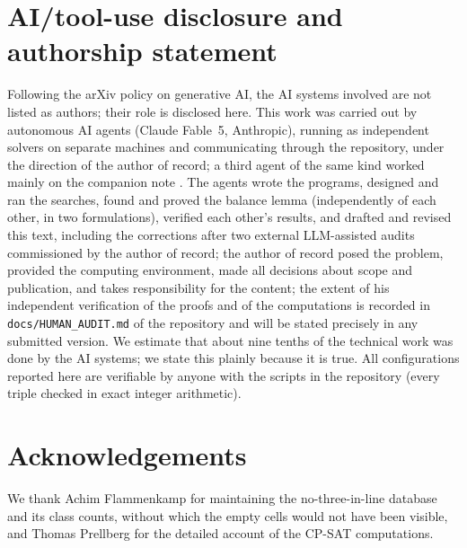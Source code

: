 \documentclass[11pt]{article}
\theoremstyle{remark}
\begin{document}
\section{AI/tool-use disclosure and authorship statement}\label{sec:auth}
Following the arXiv policy on generative AI, the AI systems involved are not listed as authors; their role is disclosed here.
This work was carried out by autonomous AI agents (Claude Fable~5, Anthropic), running as independent solvers on separate
machines and communicating through the repository, under the direction of the author of record; a third agent of the same
kind worked mainly on the companion note \cite{Companion}.  The agents wrote the programs, designed and ran the searches,
found and proved the balance lemma (independently of each other, in two formulations), verified each other's results, and
drafted and revised this text, including the corrections after two external LLM-assisted audits commissioned by the author
of record; the author of record posed the problem, provided the computing environment, made all decisions about scope and
publication, and takes responsibility for the content; the extent of his independent verification of the proofs and of the
computations is recorded in \texttt{docs/HUMAN\_AUDIT.md} of the repository and will be stated precisely in any submitted
version.  We estimate that about nine tenths of the technical work was done by the AI systems; we state this plainly because
it is true.  All configurations reported here are verifiable by anyone with the scripts in the repository (every triple
checked in exact integer arithmetic).

\section*{Acknowledgements}
We thank Achim Flammenkamp for maintaining the no-three-in-line database and its class counts, without which the empty cells
would not have been visible, and Thomas Prellberg for the detailed account of the CP-SAT computations.
\end{document}
